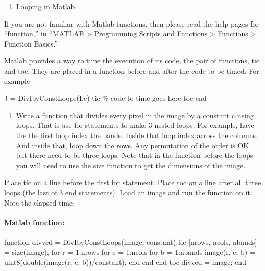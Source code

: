 \documentclass[11pt]{article}
\providecommand{\tightlist}{%
      \setlength{\itemsep}{0pt}\setlength{\parskip}{0pt}}
\newenvironment{Shaded}{}{}
\newcommand{\FloatTok}[1]{\textcolor[rgb]{0.25,0.63,0.44}{{#1}}}
\newcommand{\NormalTok}[1]{{#1}}
\begin{document}
    \begin{enumerate}
\def\labelenumi{\arabic{enumi}.}
\setcounter{enumi}{3}
\tightlist
\item
  Looping in Matlab
\end{enumerate}

If you are not familiar with Matlab functions, then please read the help
pages for ``function,'' in ``MATLAB \textgreater{} Programming Scripts
and Functions \textgreater{} Functions \textgreater{} Function Basics.''

Matlab provides a way to time the execution of its code, the pair of
functions, tic and toc. They are placed in a function before and after
the code to be timed. For example

J = DivIbyConstLoops(I,c) tic \% code to time goes here toc end

\begin{enumerate}
\def\labelenumi{(\alph{enumi})}
\tightlist
\item
  Write a function that divides every pixel in the image by a constant c
  using loops. That is use for statements to make 3 nested loops. For
  example, have the the first loop index the bands. Inside that loop
  index across the columns. And inside that, loop down the rows. Any
  permutation of the order is OK but there need to be three loops. Note
  that in the function before the loops you will need to use the size
  function to get the dimensions of the image.
\end{enumerate}

Place tic on a line before the first for statement. Place toc on a line
after all three loops (the last of 3 end statements). Load an image and
run the function on it. Note the elapsed time.

    \hypertarget{matlab-function}{%
\paragraph{Matlab function:}\label{matlab-function}}

\begin{Shaded}
\begin{Highlighting}[]
\NormalTok{function divved = DivIbyConstLoops(image, constant)}
\NormalTok{    tic}
\NormalTok{    [nrows, ncols, nbands] = size(image);}
\NormalTok{    for r = }\FloatTok{1}\NormalTok{:nrows}
\NormalTok{        for c = }\FloatTok{1}\NormalTok{:ncols}
\NormalTok{            for b = }\FloatTok{1}\NormalTok{:nbands}
\NormalTok{                image(r, c, b) = uint8(double(image(r, c, b))/constant);}
\NormalTok{            end}
\NormalTok{        end}
\NormalTok{    end}
\NormalTok{    toc}
\NormalTok{    divved = image;}
\NormalTok{end}
\end{Highlighting}
\end{Shaded}
\end{document}
